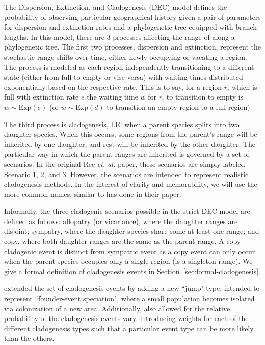 \documentclass[a4paper]{article}
\begin{document}
The Dispersion, Extinction, and Cladogenesis (DEC) model defines the probability of observing particular geographical
history given a pair of parameters for dispersion and extinction rates and a phylogenetic tree equipped with branch
lengths. 
In this model, there are 3 processes affecting the range of along a phylogenetic tree.
The first two processes, dispersion and extinction, represent the stochastic range shifts over time, either newly
occupying or vacating a region.
The process is modeled as each region independently transitioning to a different state (either from full to empty or
vise versa) with waiting times distributed exponentially based on the respective rate.
This is to say, for a region \( r_i \) which is full with extinction rate \( e \) the waiting time \( w \) for \( r_i \)
to transition to empty is \( w \sim \text{Exp}(e) \) (or $w \sim \text{Exp}(d)$ to transition an empty region to a full
region).

The third process is cladogenesis, I.E. when a parent species splits into two daughter species.
When this occurs, some regions from the parent's range will be inherited by one daughter, and rest will be inherited by
the other daughter.
The particular way in which the parent ranges are inherited is governed by a set of scenarios.
In the original Ree \textit{et. al.}\cite{ALikelihoodFrReeR2005} paper, these scenarios are simply labeled Scenario 1,
2, and 3.
However, the scenarios are intended to represent realistic cladogenesis methods.
In the interest of clarity and memorability, we will use the more common names, similar to
\citet{ModelSelectionMatzke2014} has done in their paper.

Informally, the three cladogenic scenarios possible in the strict DEC model are defined as follows: allopatry (or
vicariance), where the daughter ranges are disjoint; sympatry, where the daughter species share some at least one range;
and copy, where both daughter ranges are the same as the parent range.
A copy cladogenic event is distinct from sympatric event as a copy event can only occur when the parent species occupies
only a single region (is a singleton range).
We give a formal definition of cladogenesis events in Section~\ref{sec:formal-cladogenesis}.

\citet{ModelSelectionMatzke2014} extended the set of cladogenesis events by adding a new ``jump" type, intended to
represent ``founder-event speciation", where a small population becomes isolated via colonization of a new area.
Additionally, \citet{ModelSelectionMatzke2014} also allowed for the relative probability of the cladogenesis events
vary.
introducing weights for each of the different cladogenesis types such that a particular event type can be more likely
than the others.
\end{document}
